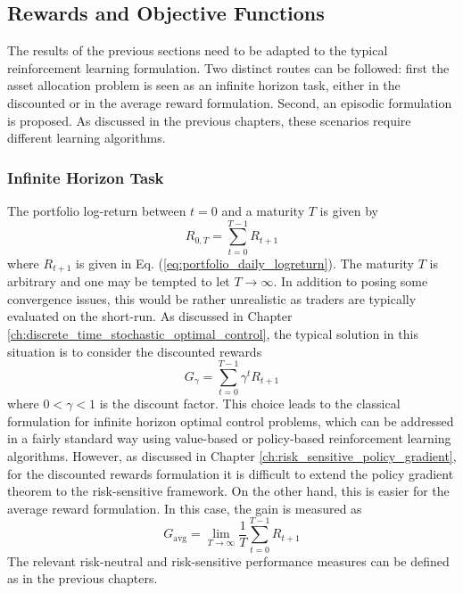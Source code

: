 \subsection{Rewards and Objective Functions}
The results of the previous sections need to be adapted to the typical reinforcement learning formulation. Two distinct routes can be followed: first the asset allocation problem is seen as an infinite horizon task, either in the discounted or in the average reward formulation. Second, an episodic formulation is proposed. As discussed in the previous chapters, these scenarios require different learning algorithms. 

\subsubsection{Infinite Horizon Task}
The portfolio log-return between $t=0$ and a maturity $T$ is given by
\begin{equation*}
	R_{0,T} = \sum_{t=0}^{T-1} R_{t+1}
\end{equation*}
where $R_{t+1}$ is given in Eq. (\ref{eq:portfolio_daily_logreturn}). The maturity $T$ is arbitrary and one may be tempted to let $T \to \infty$. In addition to posing some convergence issues, this would be rather unrealistic as traders are typically evaluated on the short-run. As discussed in Chapter \ref{ch:discrete_time_stochastic_optimal_control}, the typical solution in this situation is to consider the discounted rewards
\begin{equation*}
	G_\gamma = \sum_{t=0}^{T-1} \gamma^t R_{t+1}
\end{equation*}
where $0 < \gamma < 1$ is the discount factor. This choice leads to the classical formulation for infinite horizon optimal control problems, which can be addressed in a fairly standard way using value-based or policy-based reinforcement learning algorithms. However, as discussed in Chapter \ref{ch:risk_sensitive_policy_gradient}, for the discounted rewards formulation it is difficult to extend the policy gradient theorem to the risk-sensitive framework. On the other hand, this is easier for the average reward formulation. In this case, the gain is measured as 
\begin{equation*}
	G_\text{avg} = \lim_{T\to\infty} \frac{1}{T} \sum_{t=0}^{T-1} R_{t+1} 
\end{equation*} 
The relevant risk-neutral and risk-sensitive performance measures can be defined as in the previous chapters.\\

